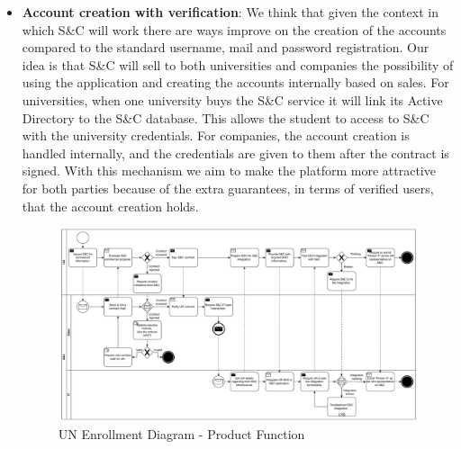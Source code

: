 \begin{itemize}
      \item \textbf{Account creation with verification}:
            We think that given the context in which S\&C will work there are ways improve on the creation of the
            accounts compared to the standard username, mail and password registration. Our idea is that S\&C will sell
            to both universities and companies the possibility of using the application and creating the accounts
            internally based on sales. For universities, when one university buys the S\&C service it will link its
            Active Directory to the S\&C database. This allows the student to access to S\&C with the university
            credentials. For companies, the account creation is handled internally, and the credentials are given to
            them after the contract is signed. With this mechanism we aim to make the platform more attractive for both
            parties because of the extra guarantees, in terms of verified users, that the account creation holds.

            \begin{figure}[H]
                  \centering
                  \includegraphics[width=1.0\textwidth]{Images/BPMN_1C.pdf}
                  \caption{UN Enrollment Diagram - Product Function}
                  \label{fig:un_enrollment_diagram}
            \end{figure}


\end{itemize}
